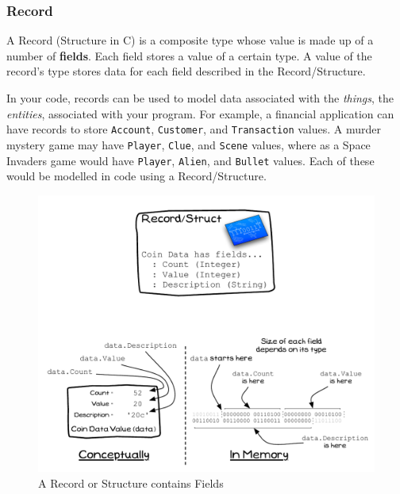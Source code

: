 \clearpage
\subsubsection{Record} %
\label{ssub:record}

A Record (Structure in C) is a composite type whose value is made up of a number of \textbf{fields}. Each field stores a value of a certain type. A value of the record's type stores data for each field described in the Record/Structure. 

In your code, records can be used to model data associated with the \emph{things}, the \emph{entities}, associated with your program. For example, a financial application can have records to store \texttt{Account}, \texttt{Customer}, and \texttt{Transaction} values. A murder mystery game may have \texttt{Player}, \texttt{Clue}, and \texttt{Scene} values, where as a Space Invaders game would have \texttt{Player}, \texttt{Alien}, and \texttt{Bullet} values. Each of these would be modelled in code using a Record/Structure.

\begin{figure}[h]
   \centering
   \includegraphics[width=\textwidth]{./topics/type-decl/diagrams/Record} 
   \caption{A Record or Structure contains Fields}
   \label{fig:type-decl-record}
\end{figure}


